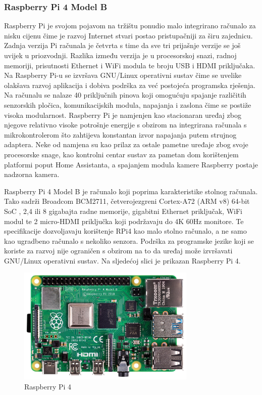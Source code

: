\documentclass[times, utf8, diplomski]{fer}
\begin{document}
\subsubsection{Raspberry Pi 4 Model B}
Raspberry Pi je svojom pojavom na tržištu ponudio malo integrirano računalo za nisku cijenu čime je razvoj Internet stvari postao pristupačniji za širu zajednicu. Zadnja verzija Pi računala je četvrta s time da sve tri prijašnje verzije se još uvijek u priozvodnji. Razlika između verzija je u procesorskoj snazi, radnoj memoriji, prisutnosti Ethernet i WiFi modula te broju USB i HDMI priključaka. Na Raspberry Pi-u se izvršava GNU/Linux operativni sustav čime se uvelike olakšava razvoj aplikacija i dobiva podrška za već postojeća programska rješenja. Na računalu se nalaze 40 priključnih pinova koji omogućuju spajanje različitih senzorskih pločica, komunikacijskih modula, napajanja i zaslona čime se postiže visoka modularnost. Raspberry Pi je namjenjen kao stacionaran uređaj zbog njegove relativno visoke potrošnje energije s obzirom na integrirana računala s mikrokontrolerom što zahtijeva konstantan izvor napajanja putem strujnog adaptera. Neke od namjena su kao prilaz za ostale pametne uređaje zbog svoje procesorske snage, kao kontrolni centar sustav za pametan dom korištenjem platformi poput Home Assistanta, a spajanjem modula kamere Raspberry postaje nadzorna kamera. 

Raspberry Pi 4 Model B\citep{RPi4} je računalo koji poprima karakteristike stolnog računala. Tako sadrži Broadcom BCM2711, četverojezgreni Cortex-A72 (ARM v8) 64-bit SoC , 2,4 ili 8 gigabajta radne memorije, gigabitni Ethernet priključak, WiFi modul te 2 micro-HDMI priključka koji podržavaju do 4K 60Hz monitore.  Te specifikacije dozvoljavaju korištenje RPi4 kao malo stolno računalo, a ne samo kao ugradbeno računalo s nekoliko senzora. Podrška za programske jezike koji se koriste za razvoj nije ograničen s obzirom na to da uređaj može izvršavati GNU/Linux operativni sustav. Na sljedećoj slici je prikazan Raspberry Pi 4.
\begin{figure}[htb]
    \centering
    \includegraphics[width=8.5cm]{images/rpi4.jpg}
    \caption{Raspberry Pi 4\citep{RPi4Img}}
    \label{fig:rpi4}
\end{figure}
\end{document}
